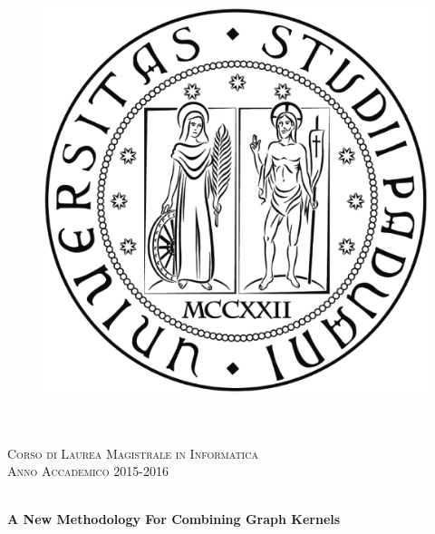\documentclass[
12pt, %
english, %
onehalfspacing, %
headsepline, %
]{MastersDoctoralThesis} %
\author{Carlo Maria \textsc{Massimo}} %
\begin{document}
\frontmatter %

\pagestyle{plain} %


\begin{titlepage}
\begin{center}

\begin{figure}
    \centering
    \includegraphics[scale=0.15]{Figures/logounipd1}
\end{figure}

\textsc{\LARGE \univname}\\[1.5cm] %
\textsc{\large \deptname}\\[0.5cm] %
 
\textsc{ Corso di Laurea Magistrale in Informatica}\\[0.5cm] %
\textsc{\small Anno Accademico 2015-2016}\\[2cm] %

\HRule \\[0.4cm] %
{\huge \bfseries A New Methodology For Combining Graph Kernels\par} %
\vspace{0.4cm}
\HRule \\[1.5cm] %


\end{center}
\end{titlepage}
\end{document}
